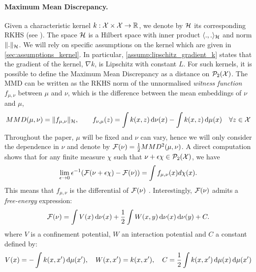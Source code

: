 \paragraph{Maximum Mean Discrepancy.}\label{subsec:MMD} Given a characteristic kernel $k : {{\mathcal X}} \times {{\mathcal X}} \to {{\mathbb R}}$, we denote by ${{\mathcal H}}$ its corresponding RKHS (see \cite{smola1998learning}). The space ${{\mathcal H}}$ is a Hilbert space with inner product $\langle .,. \rangle_{{{\mathcal H}}}$ and norm $\Vert . \Vert_{{{\mathcal H}}}$. We will rely on specific assumptions on the kernel which are given in \cref{sec:assumptions_kernel}. In particular, \cref{assump:lipschitz_gradient_k} states that the gradient of the kernel, $\nabla k$, is Lipschitz with constant $L$.
For such kernels, it is possible to define the Maximum Mean Discrepancy as a distance on $\mathcal{P}_2({{\mathcal X}})$. The MMD can be written as the RKHS norm of the unnormalised \textit{witness function} $f_{\mu,\nu}$ between $\mu$ and $\nu$, which is the difference between the mean embeddings of $\nu$ and $\mu$,
\begin{align}\label{eq:witness_function}
MMD(\mu,\nu) = \Vert f_{\mu,\nu} \Vert_{{{\mathcal H}}}, \qquad f_{\nu,\mu}(z) = \int k(x,z)\mathop{}\!\mathrm{d} \nu(x) - \int k(x,z)\mathop{}\!\mathrm{d} \mu(x)  \quad \forall z\in {{\mathcal X}}
\end{align}
Throughout the paper, $\mu$ will be fixed and $\nu$ can vary, hence we will only consider the dependence in $\nu$ and denote by ${{\mathcal F}}(\nu)= \frac{1}{2}MMD^2(\mu,\nu)$. 
A direct computation \cite[Appendix B]{Mroueh:2019} shows that for any %
finite measure $\chi$ such that $\nu + \epsilon \chi \in {{\mathcal P}}_2({{\mathcal X}})$, we have
\begin{align}\label{prop:differential_mmd}
		\lim_{\epsilon\rightarrow 0} \epsilon^{-1}({{\mathcal F}}(\nu +\epsilon\chi) - {{\mathcal F}}(\nu)) = \int f_{\mu,\nu}(x)d\chi(x).
	\end{align}
This means that $f_{\mu,\nu}$ is the differential of ${{\mathcal F}}(\nu)$ .  %
 Interestingly, ${{\mathcal F}}(\nu)$ admits a \textit{free-energy} expression:
\begin{align}\label{eq:mmd_as_free_energy}
	{{\mathcal F}}(\nu) = \int V(x) \mathop{}\!\mathrm{d} \nu(x) +\frac{1}{2} \int W(x,y)\mathop{}\!\mathrm{d} \nu(x)\mathop{}\!\mathrm{d} \nu(y) + C.
\end{align}
where $V$ is a confinement potential, $W$ an interaction potential and $C$ a constant defined by:
\begin{align}\label{eq:potentials}
V(x)=-\int  k(x,x')\mathop{}\!\mathrm{d}\mu(x'), \quad
W(x,x')=k(x,x'), \quad
C = \frac{1}{2} \int k(x,x')\mathop{}\!\mathrm{d}\mu(x) \mathop{}\!\mathrm{d}\mu(x') 
\end{align}
